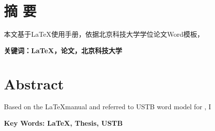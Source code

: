 
\chapter*{\centering 摘 \qquad 要 }
本文基于\LaTeX 使用手册，依据北京科技大学\degreecn 学位论文Word模板，


\vskip 30bp
\heiti {}
\textbf{关键词：\LaTeX ，\degreecn 论文，北京科技大学}



\chapter*{\centering Abstract }
Based on the \LaTeX manual and referred to USTB word model for \degreeen, I

\vskip 30bp
\textbf{Key Words: \LaTeX, \degreeen Thesis, USTB}

